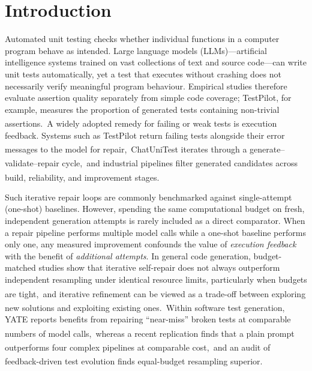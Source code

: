 \documentclass[11pt,a4paper]{article}
\newcommand{\ysjcite}[1]{\,\textsuperscript{\cite{#1}}}
\begin{document}
\section{Introduction}
Automated unit testing checks whether individual functions in a computer program behave as intended. Large language models (LLMs)---artificial intelligence systems trained on vast collections of text and source code---can write unit tests automatically, yet a test that executes without crashing does not necessarily verify meaningful program behaviour. Empirical studies therefore evaluate assertion quality separately from simple code coverage; TestPilot, for example, measures the proportion of generated tests containing non-trivial assertions.\ysjcite{schafer2024testpilot} A widely adopted remedy for failing or weak tests is execution feedback. Systems such as TestPilot return failing tests alongside their error messages to the model for repair,\ysjcite{schafer2024testpilot} ChatUniTest iterates through a generate--validate--repair cycle,\ysjcite{chen2024chatunitest} and industrial pipelines filter generated candidates across build, reliability, and improvement stages.\ysjcite{alshahwan2024testgenllm}

Such iterative repair loops are commonly benchmarked against single-attempt (one-shot) baselines. However, spending the same computational budget on fresh, independent generation attempts is rarely included as a direct comparator. When a repair pipeline performs multiple model calls while a one-shot baseline performs only one, any measured improvement confounds the value of \emph{execution feedback} with the benefit of \emph{additional attempts}. In general code generation, budget-matched studies show that iterative self-repair does not always outperform independent resampling under identical resource limits, particularly when budgets are tight,\ysjcite{olausson2024selfrepair} and iterative refinement can be viewed as a trade-off between exploring new solutions and exploiting existing ones.\ysjcite{tang2024rex} Within software test generation, YATE reports benefits from repairing ``near-miss'' broken tests at comparable numbers of model calls,\ysjcite{konstantinou2025yate} whereas a recent replication finds that a plain prompt outperforms four complex pipelines at comparable cost,\ysjcite{konstantinou2026newer} and an audit of feedback-driven test evolution finds equal-budget resampling superior.\ysjcite{liang2026auditing}
\end{document}
